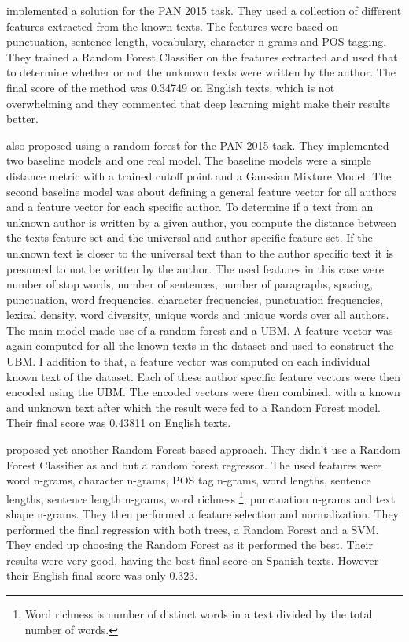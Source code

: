 \cite{maitra2015} implemented a solution for the PAN 2015 task. They used a
collection of different features extracted from the known texts. The features
were based on punctuation, sentence length, vocabulary, character n-grams and
\gls{POS} tagging. They trained a Random Forest Classifier on the features
extracted and used that to determine whether or not the unknown texts were
written by the author. The final score of the method was 0.34749 on English
texts, which is not overwhelming and they commented that deep learning might
make their results better.

\cite{pacheco2015} also proposed using a random forest for the PAN 2015 task.
They implemented two baseline models and one real model. The baseline models
were a simple distance metric with a trained cutoff point and a Gaussian Mixture
Model. The second baseline model was about defining a general feature vector for
all authors and a feature vector for each specific author.
To determine if a text from an unknown author is written by a given author,
you compute the distance between the texts feature set and the universal and
author specific feature set. If the unknown text is closer to the universal
text than to the author specific text it is presumed to not be written by
the author. The used features in this case were number of stop words, number
of sentences, number of paragraphs, spacing, punctuation, word frequencies,
character frequencies, punctuation frequencies, lexical density, word diversity,
unique words and unique words over all authors. The main model made use of a
random forest and a \gls{UBM}. A feature vector was again computed for all the
known texts in the dataset and used to construct the \gls{UBM}. I addition
to that, a feature vector was computed on each individual known text of the
dataset. Each of these author specific feature vectors were then encoded using
the \gls{UBM}. The encoded vectors were then combined, with a known and unknown
text after which the result were fed to a Random Forest model. Their final score
was 0.43811 on English texts.

\cite{bartoli2015b} proposed yet another Random Forest based approach.
They didn't use a Random Forest Classifier as \cite{maitra2015} and
\cite{pacheco2015} but a random forest regressor. The used features were word
n-grams, character n-grams, \gls{POS} tag n-grams, word lengths, sentence
lengths, sentence length n-grams, word richness \footnote{Word richness is
number of distinct words in a text divided by the total number of words.},
punctuation n-grams and text shape n-grams. They then performed a feature
selection and normalization. They performed the final regression with both
trees, a Random Forest and a \gls{SVM}. They ended up choosing the Random
Forest as it performed the best. Their results were very good, having the best
final score on Spanish texts. However their English final score was only 0.323.

